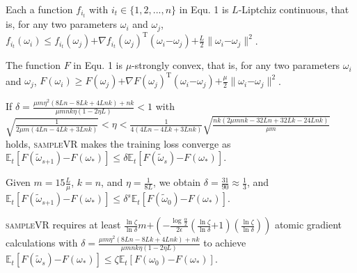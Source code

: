\documentclass[letterpaper]{article}
\begin{document}
\begin{Assumption}
\label{assumption_liptchiz}
Each a function $f_{i_t}$ with $i_t\in\{1,2, ..., n\}$ in Equ. 1 is $L$-Liptchiz continuous, that is, for any two parameters $\omega_i$ and $\omega_j$, $f_{i_t}(\omega_i)\le f_{i_t}(\omega_j)\mathrm{+}\nabla f_{i_t}(\omega_j)^\mathrm{T} (\omega_i\mathrm{-}\omega_j)\mathrm{+}\frac{L}{2}\parallel \omega_i\mathrm{-}\omega_j\parallel^2$.


\end{Assumption}

\begin{Assumption}
\label{assumption_strongly_convex}
The function $F$ in Equ. 1 is $\mu$-strongly convex, that is, for any two parameters $\omega_i$ and $\omega_j$, $F(\omega_i)\ge F(\omega_j)\mathrm{+}\nabla F(\omega_j)^\mathrm{T} (\omega_i\mathrm{-}\omega_j)\mathrm{+}\frac{\mu}{2}\parallel \omega_i\mathrm{-}\omega_j\parallel^2$.
\end{Assumption}

\begin{Theorem}
\label{Theorem_converge}
If $\delta=\frac{\mu m \eta^2 (8Ln-8Lk+4Lnk)+nk}{  \mu m nk \eta (1-2\eta L)  } < 1$ with $\sqrt{\frac{1}{2\mu m (4Ln-4Lk+3Lnk)}} < \eta < \frac{1}{4(4Ln-4Lk+3Lnk)}\sqrt{\frac{nk(2\mu mnk - 32Ln+ 32 Lk -24 Lnk)}{\mu m}}$ holds, \textsc{sampleVR} makes the training loss converge as
$\mathbb{E}_t[F(\tilde{\omega}_{s\mathrm{+}1}) \mathrm{-} F(\omega_\ast)]  \le \delta \mathbb{E}_t[F(\tilde{\omega}_s)\mathrm{-}F(\omega_\ast)]$.
\end{Theorem}

\begin{Corollary}
\label{Corollary_converge}
Given $m\mathrm{=}15\frac{L}{\mu}$, $k\mathrm{=}n$, and $\eta\mathrm{=}\frac{1}{8L}$, we obtain $\delta \mathrm{=} \frac{31}{90} \mathrm{\approx} \frac{1}{3}$, and $\mathbb{E}_t[F(\tilde{\omega}_{s\mathrm{+}1}) \mathrm{-} F(\omega_\ast)]  \le \delta^s \mathbb{E}_t[F(\tilde{\omega}_0)\mathrm{-}F(\omega_\ast)]$.

\end{Corollary}


\begin{Theorem}
\label{theorem_gradient_complexity}
\textsc{sampleVR} requires at least  $\frac{\ln \zeta}{\ln \delta}m\mathrm{+}\left( \mathrm{-} \frac{\log\frac{\alpha}{2}}{2\epsilon} (\frac{\ln \zeta}{\ln \delta}\mathrm{+}1)(\frac{\ln \zeta}{\ln \delta})\right)$ atomic gradient calculations with $ \delta=\frac{\mu m \eta^2 (8Ln-8Lk+4Lnk)+nk}{  \mu m nk \eta (1-2\eta L)  } $ to achieve $\mathbb{E}_t[F(\tilde{\omega}_s)\mathrm{-}F(\omega_\ast)] \mathrm{\le} \zeta \mathbb{E}_t[F(\omega_0)\mathrm{-}F(\omega_\ast)]$.
\end{Theorem}
\end{document}
